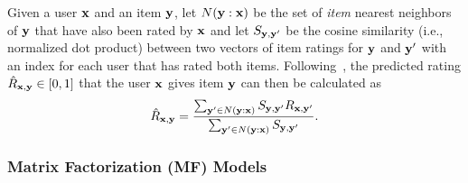 Given a user $\mathbf{x}$ and an item $\mathbf{y}$, let $N(\mathbf{y}:\mathbf{x})$ be the set of
\emph{item} nearest neighbors of $\mathbf{y}$ that have also been rated by
$\mathbf{x}$ and let $S_{\mathbf{y},\mathbf{y}'}$ be the cosine similarity (i.e., normalized
dot product) between two vectors of item ratings for $\mathbf{y}$ and $\mathbf{y}'$ with
an index for each user that has rated both items.  Following~\cite{bellkor},
the predicted rating $\hat{R}_{\mathbf{x},\mathbf{y}} \in [0,1]$ that the user $\mathbf{x}$
gives item $\mathbf{y}$ can then be calculated as
\begin{equation}
\hat{R}_{\mathbf{x},\mathbf{y}} = \frac{\sum_{\mathbf{y}' \in N(\mathbf{y}:\mathbf{x})} {S_{\mathbf{y},\mathbf{y}'} R_{\mathbf{x},\mathbf{y}'}} } {\sum_{\mathbf{y}' \in N(\mathbf{y}:\mathbf{x})}{S_{\mathbf{y},\mathbf{y}'}}} .
\end{equation}


\subsubsection{Matrix Factorization (MF) Models}
\label{sec:mf}

